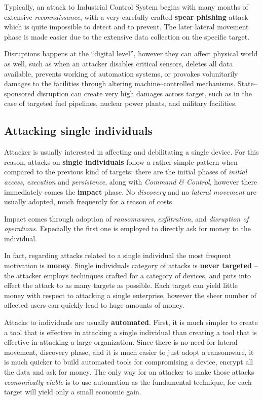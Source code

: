 \documentclass[10pt]{extbook}
\begin{document}
Typically, an attack to Industrial Control System begins with many months of
extensive \emph{reconnaissance}, with a very\--carefully crafted \textbf{spear
phishing} attack which is quite impossible to detect and to prevent. The later
lateral movement phase is made easier due to the extensive data collection on
the specific target.

Disruptions happens at the ``digital level'', however they can affect physical
world as well, such as when an attacker disables critical sensors, deletes all
data available, prevents working of automation systems, or provokes
volunitarily damages to the facilities through altering machine--controlled
mechanisms. State--sponsored disruption can create very high damages across
target, such as in the case of targeted fuel pipelines, nuclear power plants,
and military facilities.


\subsection{Attacking single individuals}

Attacker is usually interested in affecting and debilitating a single device.
For this reason, attacks on \textbf{single individuals} follow a rather simple
pattern when compared to the previous kind of targets: there are the initial
phases of \emph{initial access}, \emph{execution} and \emph{persistence}, along
with \emph{Command \& Control}, however there immediately comes the
\textbf{impact} phase. No \emph{discovery} and no \emph{lateral movement} are
usually adopted, much frequently for a reason of costs.

Impact comes through adoption of \emph{ransomwares}, \emph{exfiltration}, and
\emph{disruption of operations}. Especially the first one is employed to
directly ask for money to the individual.

In fact, regarding attacks related to a single individual the most frequent
motivation is \textbf{money}. Single individuals category of attacks is
\textbf{never targeted} -- the attacker employs techinques crafted for a category
of devices, and puts into effect the attack to as many targets as possible.
Each target can yield little money with respect to attacking a single
enterprise, however the sheer number of affected users can quickly lead to huge
amounts of money.

Attacks to individuals are usually \textbf{automated}. First, it is much
simpler to create a tool that is effective in attacking a single individual
than creating a tool that is effective in attacking a large organization. Since
there is no need for lateral movement, discovery phase, and it is much easier
to just adopt a ransomware, it is much quicker to build automated tools for
compromising a device, encrypt all the data and ask for money. The only way for
an attacker to make those attacks \emph{economically viable} is to use
automation as the fundamental technique, for each target will yield only a small
economic gain.
\end{document}
